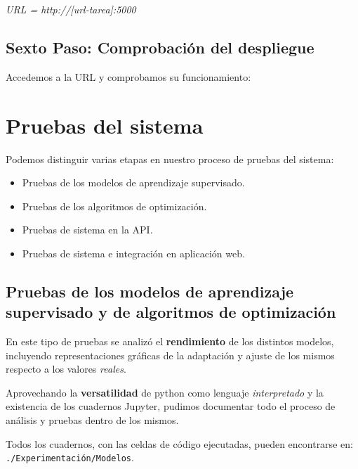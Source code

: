 \textit{URL = http://[url-tarea]:5000}


\subsection{Sexto Paso: Comprobación del despliegue}

Accedemos a la URL y comprobamos su funcionamiento:


\section{Pruebas del sistema}

Podemos distinguir varias etapas en nuestro proceso de pruebas del sistema: 

\begin{itemize}
    \item Pruebas de los modelos de aprendizaje supervisado.
    \item Pruebas de los algoritmos de optimización.
    \item Pruebas de sistema en la API.
    \item Pruebas de sistema e integración en aplicación web.
\end{itemize}

\subsection{Pruebas de los modelos de aprendizaje supervisado y de algoritmos de optimización}

En este tipo de pruebas se analizó el \textbf{rendimiento} de los distintos modelos, incluyendo representaciones gráficas de la adaptación y ajuste de los mismos respecto a los valores \textit{reales}.

Aprovechando la \textbf{versatilidad} de python como lenguaje \textit{interpretado} y la existencia de los cuadernos Jupyter, pudimos documentar todo el proceso de análisis y pruebas dentro de los mismos.


Todos los cuadernos, con las celdas de código ejecutadas, pueden encontrarse en: \texttt{./Experimentación/Modelos}.

